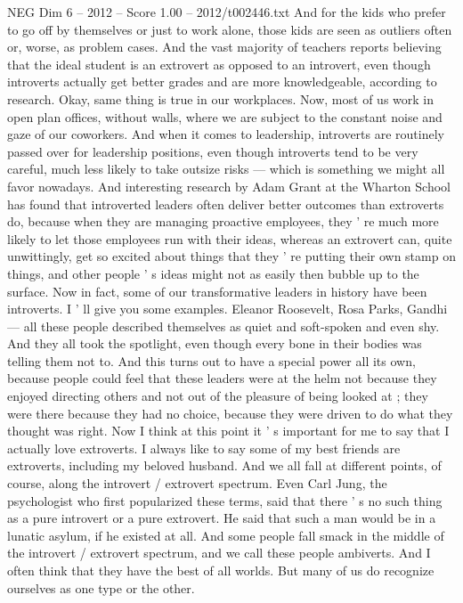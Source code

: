 \begin{textsample}{NEG Dim 6 – 2012 – Score 1.00 – 2012/t002446.txt}
And for the kids who prefer to go off by themselves or just to work alone, those kids are seen as outliers often or, worse, as problem cases.
And the vast majority of teachers reports believing that the ideal student is an extrovert as opposed to an introvert, even though introverts actually get better grades and are more knowledgeable, according to research.
Okay, same thing is true in our workplaces.
Now, most of us work in open plan offices, without walls, where we are subject to the constant noise and gaze of our coworkers.
And when it comes to leadership, introverts are routinely passed over for leadership positions, even though introverts tend to be very careful, much less likely to take outsize risks — which is something we might all favor nowadays.
And interesting research by Adam Grant at the Wharton School has found that introverted leaders often deliver better outcomes than extroverts do, because when they are managing proactive employees, they ' re much more likely to let those employees run with their ideas, whereas an extrovert can, quite unwittingly, get so excited about things that they ' re putting their own stamp on things, and other people ' s ideas might not as easily then bubble up to the surface.
Now in fact, some of our transformative leaders in history have been introverts.
I ' ll give you some examples.
Eleanor Roosevelt, Rosa Parks, Gandhi — all these people described themselves as quiet and soft-spoken and even shy.
And they all took the spotlight, even though every bone in their bodies was telling them not to.
And this turns out to have a special power all its own, because people could feel that these leaders were at the helm not because they enjoyed directing others and not out of the pleasure of being looked at ; they were there because they had no choice, because they were driven to do what they thought was right.
Now I think at this point it ' s important for me to say that I actually love extroverts.
I always like to say some of my best friends are extroverts, including my beloved husband.
And we all fall at different points, of course, along the introvert / extrovert spectrum.
Even Carl Jung, the psychologist who first popularized these terms, said that there ' s no such thing as a pure introvert or a pure extrovert.
He said that such a man would be in a lunatic asylum, if he existed at all.
And some people fall smack in the middle of the introvert / extrovert spectrum, and we call these people ambiverts.
And I often think that they have the best of all worlds.
But many of us do recognize ourselves as one type or the other.

\end{textsample}
